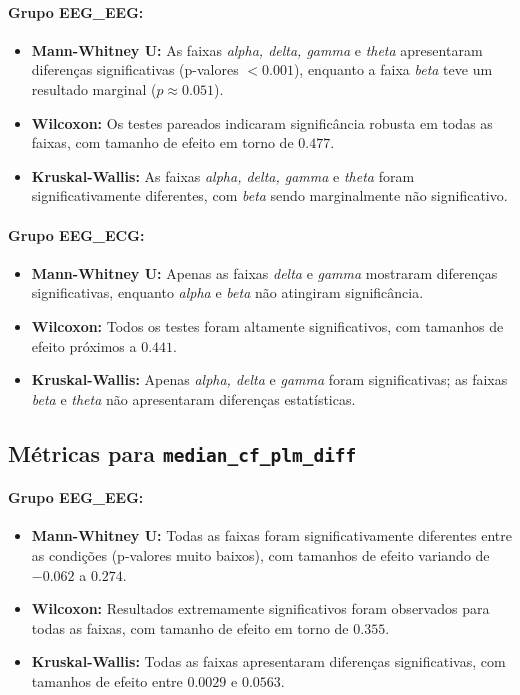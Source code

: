 \paragraph{Grupo EEG\_EEG:}
\begin{itemize}
    \item \textbf{Mann-Whitney U:} As faixas \emph{alpha, delta, gamma} e \emph{theta} apresentaram diferenças significativas (p-valores $< 0.001$), enquanto a faixa \emph{beta} teve um resultado marginal ($p \approx 0.051$).
    \item \textbf{Wilcoxon:} Os testes pareados indicaram significância robusta em todas as faixas, com tamanho de efeito em torno de $0.477$.
    \item \textbf{Kruskal-Wallis:} As faixas \emph{alpha, delta, gamma} e \emph{theta} foram significativamente diferentes, com \emph{beta} sendo marginalmente não significativo.
\end{itemize}

\paragraph{Grupo EEG\_ECG:}
\begin{itemize}
    \item \textbf{Mann-Whitney U:} Apenas as faixas \emph{delta} e \emph{gamma} mostraram diferenças significativas, enquanto \emph{alpha} e \emph{beta} não atingiram significância.
    \item \textbf{Wilcoxon:} Todos os testes foram altamente significativos, com tamanhos de efeito próximos a $0.441$.
    \item \textbf{Kruskal-Wallis:} Apenas \emph{alpha, delta} e \emph{gamma} foram significativas; as faixas \emph{beta} e \emph{theta} não apresentaram diferenças estatísticas.
\end{itemize}

\subsection{\texorpdfstring{Métricas para \texttt{median\_cf\_plm\_diff}}{Métricas para median\_cf\_plm\_diff}}
\paragraph{Grupo EEG\_EEG:}
\begin{itemize}
    \item \textbf{Mann-Whitney U:} Todas as faixas foram significativamente diferentes entre as condições (p-valores muito baixos), com tamanhos de efeito variando de $-0.062$ a $0.274$.
    \item \textbf{Wilcoxon:} Resultados extremamente significativos foram observados para todas as faixas, com tamanho de efeito em torno de $0.355$.
    \item \textbf{Kruskal-Wallis:} Todas as faixas apresentaram diferenças significativas, com tamanhos de efeito entre $0.0029$ e $0.0563$.
\end{itemize}

